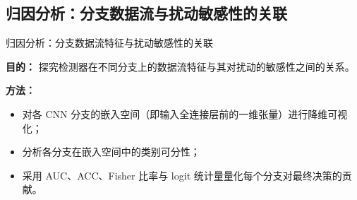 \documentclass[aspectratio=169]{beamer}
\begin{document}
\subsection{归因分析：分支数据流与扰动敏感性的关联}
\begin{frame}{归因分析：分支数据流特征与扰动敏感性的关联}

\textbf{目的：}  
探究检测器在不同分支上的数据流特征与其对扰动的敏感性之间的关系。

\vspace{0.6em}
\textbf{方法：}
\begin{itemize}
  \item 对各 CNN 分支的嵌入空间（即输入全连接层前的一维张量）进行降维可视化；
  \item 分析各分支在嵌入空间中的类别可分性；
  \item 采用 AUC、ACC、Fisher 比率与 logit 统计量量化每个分支对最终决策的贡献。
\end{itemize}
\end{frame}

\end{document}
